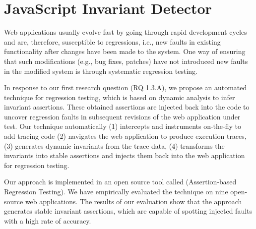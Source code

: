 \chapter{JavaScript Invariant Detector}
\label{Chap:jsart}
Web applications usually evolve fast by going through rapid development cycles and are, therefore, susceptible to regressions, i.e., new faults in existing functionality after changes have been made to the system. One way of ensuring that such modifications (e.g., bug fixes, patches) have not introduced new faults in the modified system is through systematic regression testing.

In response to our first research question (RQ 1.3.A), we propose \cite{mirshokraie:icwe12} an automated technique for \javascript regression testing, which is based on dynamic analysis to infer invariant assertions. These obtained assertions are injected back into the \javascript code to uncover regression faults in subsequent revisions of the web application under test. 
Our technique automatically (1) intercepts and instruments \javascript on-the-fly to add tracing code (2) navigates the web application to produce execution traces, (3) generates dynamic invariants from the trace data, (4) transforms the invariants into stable assertions and injects them back into the web application for regression testing.

Our approach is implemented in an open source tool called \jsart (\javascript Assertion-based Regression Testing).  We have empirically
evaluated the technique on nine open-source web applications. The results of our evaluation show that the approach generates stable invariant assertions, which are capable of spotting injected faults with a high rate of accuracy.





%
